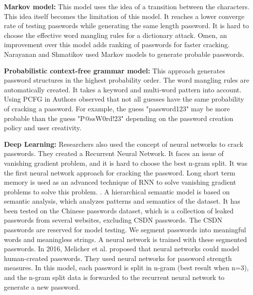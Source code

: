 \documentclass[runningheads]{llncs}
\begin{document}
\textbf{Markov model:} This model uses the idea of a transition between the characters. This idea itself becomes the limitation of this model. It reaches a lower converge rate of testing passwords while generating the same length password. It is hard to choose the effective word mangling rules for a dictionary attack. Omen, an improvement over this model \cite{10.1007/978-3-319-15618-7_10} adds ranking of passwords for faster cracking. Narayanan and Shmatikov \cite{Narayanan:2005:FDA:1102120.1102168} used Markov models to generate probable passwords.

\textbf{Probabilistic context-free grammar model:} This approach generates password structures in the highest probability order. The word mangling rules are automatically created. It takes a keyword and multi-word pattern into account. \cite{7098389} Using PCFG in \cite{5207658} Authors observed that not all guesses have the same probability of cracking a password. For example, the guess "password123" may be more probable than the guess "P@ssW0rd!23" depending on the password creation policy and user creativity.

\textbf{Deep Learning:} Researchers also used the concept of neural networks to crack passwords. They created a Recurrent Neural Network\cite{197243}. It faces an issue of vanishing gradient problem, and it is hard to choose the best n-gram split. It was the first neural network approach for cracking the password. Long short term memory is used as an advanced technique of RNN to solve vanishing gradient problems to solve this problem. \cite{DBLP:journals/corr/Lipton15}. A hierarchical semantic model is based on semantic analysis, which analyzes patterns and semantics of the dataset. It has been tested on the Chinese passwords dataset, which is a collection of leaked passwords from several websites, excluding CSDN passwords. The CSDN passwords are reserved for model testing. We segment passwords into meaningful words and meaningless strings. A neural network is trained with these segmented passwords. \cite{10.1007/978-981-13-5913-2_6} In 2016, Melicher et al. proposed that neural networks could model human-created passwords. They used neural networks for password strength measures. \cite{197243} In this model, each password is split in n-gram (best result when n=3), and the n-gram split data is forwarded to the recurrent neural network to generate a new password.

\end{document}
